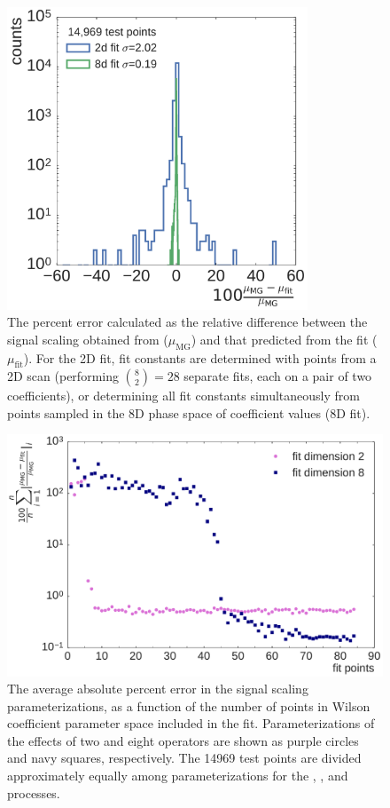 \begin{figure}
  \centering
  \includegraphics[width=0.8\textwidth]{figures/thirteen-TeV/NP/fit_quality_by_dim}
  \caption[Percent error of cross section fit]{The percent error calculated as the relative difference between the signal scaling obtained from \madgraph ($\mu_\text{MG}$) and that predicted from the fit ($\mu_\text{fit}$). For the 2D fit, fit constants are determined with points from a 2D scan (performing $\binom{8}{2}=28$ separate fits, each on a pair of two coefficients), or determining all fit constants simultaneously from points sampled in the 8D phase space of coefficient values (8D fit).}
  \label{fig:fit-error}
\end{figure}
\begin{figure}
  \includegraphics[width=\textwidth]{figures/thirteen-TeV/NP/fit_quality_by_points}
  \caption[Signal scaling fit quality as a function of included points]{The average absolute percent error in the signal scaling parameterizations, as a function of the number of points in Wilson coefficient parameter space included in the fit. Parameterizations of the effects of two and eight operators are shown as purple circles and navy squares, respectively. The \num{14969} test points are divided approximately equally among parameterizations for the \ttH, \ttW, and \ttZ processes.}
  \label{fig:fit-points}
\end{figure}
